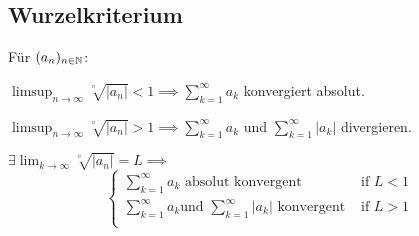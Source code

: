 \subsection{Wurzelkriterium}
Für $(a_n)_{n \in \mathbb{N}}$:
\begin{compactenum}
    \item $\limsup_{n \to \infty} \sqrt[^n]{\left| a_n \right| } < 1 \implies \sum_{k=1}^{\infty} a_k$ konvergiert absolut.
    \item $\limsup_{n \to \infty} \sqrt[^n]{\left| a_n \right| } > 1 \implies \sum_{k=1}^{\infty} a_k$ und $\sum_{k=1}^{\infty} |a_k|$ divergieren.
\end{compactenum}
\begin{compactitem}
    \item $\exists \lim_{k \to \infty} \sqrt[^n]{ \left| a_n \right| }  = L \implies$
        \[
        \begin{cases}
            \sum_{k=1}^{\infty} a_k \text{ absolut konvergent} & \text{ if } L < 1\\
            \sum_{k=1}^{\infty} a_k \text{und }\sum_{k=1}^{\infty} |a_k| \text{ konvergent} & \text{ if } L > 1\\
        \end{cases}
        \] 
\end{compactitem}

